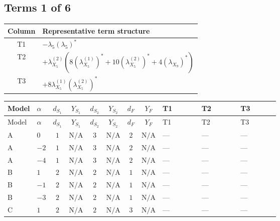 \documentclass[8pt]{article}
\begin{document}
\begin{landscape}
\subsection*{Terms 1 of 6}
\begin{center}
\begin{tabular}{@{}c >{\raggedright\arraybackslash}p{0.82\linewidth}@{}}
\toprule
Column & Representative term structure \\
\midrule
T1 & \(\displaystyle -{\lambda_5} \left({\lambda_5}\right)^{*}\) \\
\midrule
T2 & \(\displaystyle +{\lambda_{X_{5}}^{(2)}} (8 \left({\lambda_{X_{5}}^{(1)}}\right)^{*}+10 \left({\lambda_{X_{5}}^{(2)}}\right)^{*}+4 \left({\lambda_{X_{9}}}\right)^{*})\) \\
\midrule
T3 & \(\displaystyle +8 {\lambda_{X_{5}}^{(1)}} \left({\lambda_{X_{5}}^{(2)}}\right)^{*}\) \\
\midrule
\bottomrule
\end{tabular}
\end{center}
\smallskip
\tiny
\begin{longtable}{@{}llcccccc >{\raggedright\arraybackslash}p{0.21\linewidth} >{\raggedright\arraybackslash}p{0.21\linewidth} >{\raggedright\arraybackslash}p{0.21\linewidth}@{}}
\toprule
Model & $\alpha$ & $d_{S_1}$ & $Y_{S_1}$ & $d_{S_2}$ & $Y_{S_2}$ & $d_F$ & $Y_F$ & T1 & T2 & T3 \\
\midrule
\endfirsthead
\toprule
Model & $\alpha$ & $d_{S_1}$ & $Y_{S_1}$ & $d_{S_2}$ & $Y_{S_2}$ & $d_F$ & $Y_F$ & T1 & T2 & T3 \\
\midrule
\endhead
A & $0$ & $1$ & $\text{N/A}$ & $3$ & $\text{N/A}$ & $2$ & $\text{N/A}$ & --- & --- & --- \\
\midrule
A & $-2$ & $1$ & $\text{N/A}$ & $3$ & $\text{N/A}$ & $2$ & $\text{N/A}$ & --- & --- & --- \\
\midrule
A & $-4$ & $1$ & $\text{N/A}$ & $3$ & $\text{N/A}$ & $2$ & $\text{N/A}$ & --- & --- & --- \\
\midrule
B & $1$ & $2$ & $\text{N/A}$ & $2$ & $\text{N/A}$ & $1$ & $\text{N/A}$ & --- & --- & --- \\
\midrule
B & $-1$ & $2$ & $\text{N/A}$ & $2$ & $\text{N/A}$ & $1$ & $\text{N/A}$ & --- & --- & --- \\
\midrule
B & $-3$ & $2$ & $\text{N/A}$ & $2$ & $\text{N/A}$ & $1$ & $\text{N/A}$ & --- & --- & --- \\
\midrule
C & $1$ & $2$ & $\text{N/A}$ & $2$ & $\text{N/A}$ & $3$ & $\text{N/A}$ & --- & --- & --- \\

\end{longtable}
\end{landscape}
\end{document}
